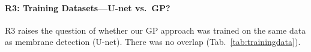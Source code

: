 \documentclass[10pt,twocolumn,letterpaper]{article}
\begin{document}

\paragraph{R3: Training Datasets---U-net vs.~GP?}
R3 raises the question of whether our GP approach was trained on the same data as membrane detection (U-net). There was no overlap (Tab.~\ref{tab:trainingdata}).

\begin{table}[h]
\caption{Training data of membrane detection vs.~training data of GP (for supplemental material).}%
\label{tab:trainingdata}
\end{table}
\end{document}
